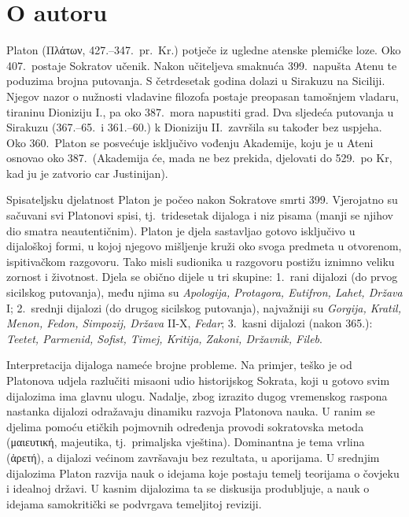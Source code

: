 \section*{O autoru}

Platon \textgreek[variant=ancient]{(Πλάτων,} 427.–347.\ pr.~Kr.)  potječe iz ugledne atenske plemićke loze. Oko 407.\ postaje Sokratov učenik. Nakon učiteljeva smaknuća 399.\ napušta Atenu te poduzima brojna putovanja. S četrdesetak godina dolazi u Sirakuzu na Siciliji. Njegov nazor o nužnosti vladavine filozofa postaje preopasan tamošnjem vladaru, tiraninu Dioniziju I., pa oko 387.\ mora napustiti grad. Dva sljedeća putovanja u Sirakuzu (367.–65.\ i 361.–60.) k Dioniziju II.\ završila su također bez uspjeha. Oko 360.\ Platon se posvećuje isključivo vođenju Akademije, koju je  u Ateni osnovao oko 387.\ (Akademija će, mada ne bez prekida, djelovati do 529.\ po Kr, kad ju je zatvorio car Justinijan).

Spisateljsku djelatnost Platon je počeo nakon Sokratove smrti 399. Vjerojatno su sačuvani svi Platonovi spisi, tj.\ tridesetak dijaloga i niz pisama (manji se njihov dio smatra neautentičnim). Platon je djela sastavljao gotovo isključivo u dijaloškoj formi, u kojoj njegovo mišljenje kruži oko svoga predmeta u otvorenom, ispitivačkom razgovoru. Tako misli sudionika u razgovoru postižu iznimno veliku zornost i životnost. Djela se obično dijele u tri skupine: 1.\ rani dijalozi (do prvog sicilskog putovanja), među njima su \textit{Apologija, Protagora, Eutifron, Lahet, Država} I; 2.\ srednji dijalozi (do drugog sicilskog putovanja), najvažniji su \textit{Gorgija, Kratil, Menon, Fedon, Simpozij, Država} II-X, \textit{Fedar}; 3.\ kasni dijalozi (nakon 365.): \textit{Teetet, Parmenid, Sofist, Timej, Kritija, Zakoni, Državnik, Fileb}. 

Interpretacija dijaloga nameće brojne probleme. Na primjer, teško je od Platonova udjela razlučiti misaoni udio historijskog Sokrata, koji u gotovo svim dijalozima ima glavnu ulogu. Nadalje, zbog izrazito dugog vremenskog raspona nastanka dijalozi odražavaju dinamiku razvoja Platonova nauka. U ranim se djelima pomoću etičkih pojmovnih određenja provodi sokratovska metoda \textgreek[variant=ancient]{(μαιευτική,} majeutika, tj.\ primaljska vještina). Dominantna je tema vrlina \textgreek[variant=ancient]{(ἀρετή),} a dijalozi većinom završavaju bez rezultata, u aporijama. U srednjim dijalozima Platon razvija nauk o idejama koje postaju temelj teorijama o čovjeku i idealnoj državi. U kasnim dijalozima ta se diskusija produbljuje, a nauk o idejama samokritički se podvrgava temeljitoj reviziji. 

